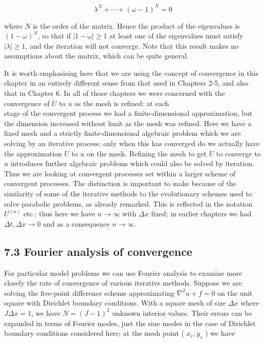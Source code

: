 \documentclass[10pt]{article}
\begin{document}
\[
\lambda^{N}+\cdots+(\omega-1)^{N}=0
\]

where \(N\) is the order of the matrix. Hence the product of the eigenvalues is \((1-\omega)^{N}\), so that if \(|1-\omega| \geq 1\) at least one of the eigenvalues must satisfy \(|\lambda| \geq 1\), and the iteration will not converge. Note that this result makes no assumptions about the matrix, which can be quite general.

It is worth emphasising here that we are using the concept of convergence in this chapter in an entirely different sense from that used in Chapters 2-5, and also that in Chapter 6. In all of those chapters we were concerned with the convergence of \(U\) to \(u\) as the mesh is refined: at each\\
stage of the convergent process we had a finite-dimensional approximation, but the dimension increased without limit as the mesh was refined. Here we have a fixed mesh and a strictly finite-dimensional algebraic problem which we are solving by an iterative process: only when this has converged do we actually have the approximation \(U\) to \(u\) on the mesh. Refining the mesh to get \(U\) to converge to \(u\) introduces further algebraic problems which could also be solved by iteration. Thus we are looking at convergent processes set within a larger scheme of convergent processes. The distinction is important to make because of the similarity of some of the iterative methods to the evolutionary schemes used to solve parabolic problems, as already remarked. This is reflected in the notation \(U^{(n)}\) etc.: thus here we have \(n \rightarrow \infty\) with \(\Delta x\) fixed; in earlier chapters we had \(\Delta t, \Delta x \rightarrow 0\) and as a consequence \(n \rightarrow \infty\).

\subsection*{7.3 Fourier analysis of convergence}
For particular model problems we can use Fourier analysis to examine more closely the rate of convergence of various iterative methods. Suppose we are solving the five-point difference scheme approximating \(\nabla^{2} u+f=0\) on the unit square with Dirichlet boundary conditions. With a square mesh of size \(\Delta x\) where \(J \Delta x=1\), we have \(N=(J-1)^{2}\) unknown interior values. Their errors can be expanded in terms of Fourier modes, just the sine modes in the case of Dirichlet boundary conditions considered here; at the mesh point ( \(x_{r}, y_{s}\) ) we have
\end{document}
